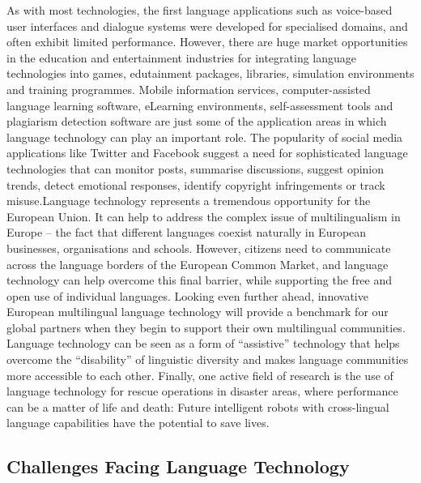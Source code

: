 \documentclass{../../metanetpaper}
\begin{document}
\begin{multicols}{2}
As with most technologies, the first language applications such as voice-based user interfaces and dialogue systems were developed for specialised domains, and often exhibit limited performance. However, there are huge market opportunities in the education and entertainment industries for integrating language technologies into games, edutainment packages, libraries, simulation environments and training programmes. Mobile information services, computer-assisted language learning software, eLearning environments, self-assessment tools and plagiarism detection software are just some of the application areas in which language technology can play an important role. The popularity of social media applications like Twitter and Facebook suggest a need for sophisticated language technologies that can monitor posts, summarise discussions, suggest opinion trends, detect emotional responses, identify copyright infringements or track misuse.Language technology represents a tremendous opportunity for the European Union. It can help to address the complex issue of multilingualism in Europe -- the fact that different languages coexist naturally in European businesses, organisations and schools. However, citizens need to communicate across the language borders of the European Common Market, and language technology can help overcome this final barrier, while supporting the free and open use of individual languages. Looking even further ahead, innovative European multilingual language technology will provide a benchmark for our global partners when they begin to support their own multilingual communities. Language technology can be seen as a form of “assistive” technology that helps overcome the “disability” of linguistic diversity and makes language communities more accessible to each other. Finally, one active field of research is the use of language technology for rescue operations in disaster areas, where performance can be a matter of life and death: Future intelligent robots with cross-lingual language capabilities have the potential to save lives.

\subsection{Challenges Facing Language Technology}


\end{multicols}
\end{document}
